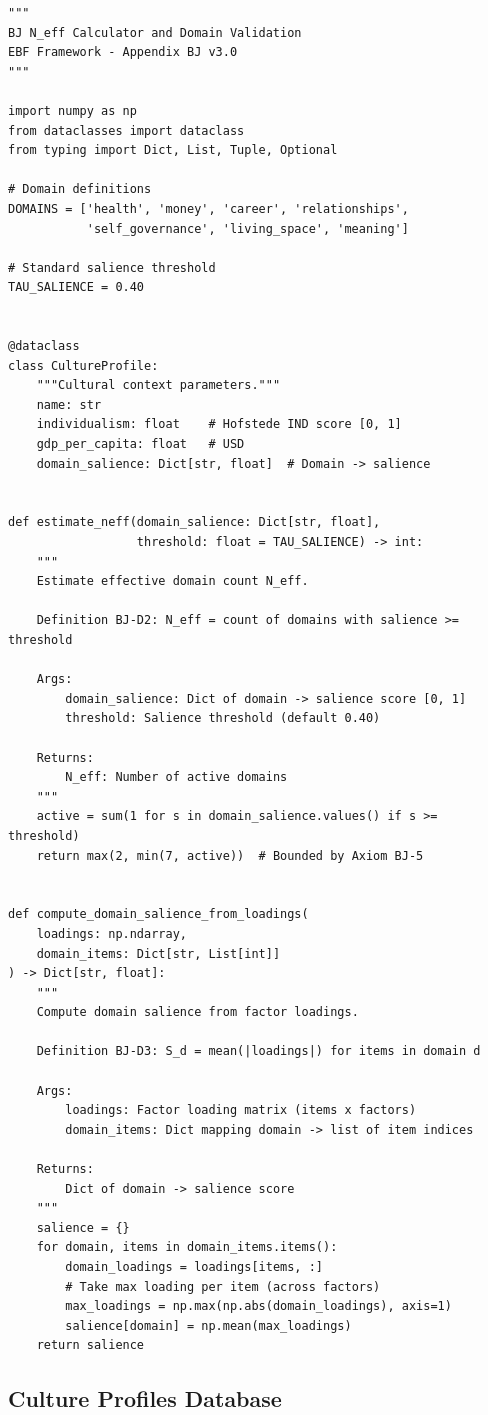 \begin{verbatim}
"""
BJ N_eff Calculator and Domain Validation
EBF Framework - Appendix BJ v3.0
"""

import numpy as np
from dataclasses import dataclass
from typing import Dict, List, Tuple, Optional

# Domain definitions
DOMAINS = ['health', 'money', 'career', 'relationships',
           'self_governance', 'living_space', 'meaning']

# Standard salience threshold
TAU_SALIENCE = 0.40


@dataclass
class CultureProfile:
    """Cultural context parameters."""
    name: str
    individualism: float    # Hofstede IND score [0, 1]
    gdp_per_capita: float   # USD
    domain_salience: Dict[str, float]  # Domain -> salience


def estimate_neff(domain_salience: Dict[str, float],
                  threshold: float = TAU_SALIENCE) -> int:
    """
    Estimate effective domain count N_eff.

    Definition BJ-D2: N_eff = count of domains with salience >= threshold

    Args:
        domain_salience: Dict of domain -> salience score [0, 1]
        threshold: Salience threshold (default 0.40)

    Returns:
        N_eff: Number of active domains
    """
    active = sum(1 for s in domain_salience.values() if s >= threshold)
    return max(2, min(7, active))  # Bounded by Axiom BJ-5


def compute_domain_salience_from_loadings(
    loadings: np.ndarray,
    domain_items: Dict[str, List[int]]
) -> Dict[str, float]:
    """
    Compute domain salience from factor loadings.

    Definition BJ-D3: S_d = mean(|loadings|) for items in domain d

    Args:
        loadings: Factor loading matrix (items x factors)
        domain_items: Dict mapping domain -> list of item indices

    Returns:
        Dict of domain -> salience score
    """
    salience = {}
    for domain, items in domain_items.items():
        domain_loadings = loadings[items, :]
        # Take max loading per item (across factors)
        max_loadings = np.max(np.abs(domain_loadings), axis=1)
        salience[domain] = np.mean(max_loadings)
    return salience
\end{verbatim}

\subsection{Culture Profiles Database}


